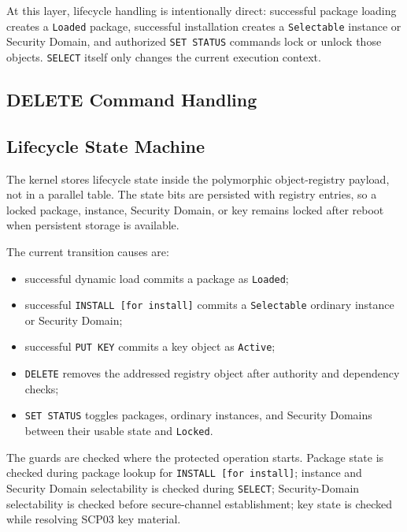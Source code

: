 At this layer, lifecycle handling is intentionally direct: successful package
loading creates a \texttt{Loaded} package, successful installation creates a
\texttt{Selectable} instance or Security Domain, and authorized
\texttt{SET STATUS} commands lock or unlock those objects. \texttt{SELECT}
itself only changes the current execution context.

\subsection{DELETE Command Handling}
\label{sec:impl-delete}

\tbc

\subsection{Lifecycle State Machine}
\label{sec:impl-lifecycle-sm}

The kernel stores lifecycle state inside the polymorphic object-registry
payload, not in a parallel table. The state bits are persisted with registry
entries, so a locked package, instance, Security Domain, or key remains locked
after reboot when persistent storage is available.

The current transition causes are:
\begin{itemize}
\item successful dynamic load commits a package as \texttt{Loaded};
\item successful \texttt{INSTALL [for install]} commits a
      \texttt{Selectable} ordinary instance or Security Domain;
\item successful \texttt{PUT KEY} commits a key object as \texttt{Active};
\item \texttt{DELETE} removes the addressed registry object after authority
      and dependency checks;
\item \texttt{SET STATUS} toggles packages, ordinary instances, and Security
      Domains between their usable state and \texttt{Locked}.
\end{itemize}

The guards are checked where the protected operation starts. Package state is
checked during package lookup for \texttt{INSTALL [for install]}; instance and
Security Domain selectability is checked during \texttt{SELECT};
Security-Domain selectability is checked before secure-channel establishment;
key state is checked while resolving SCP03 key material.

